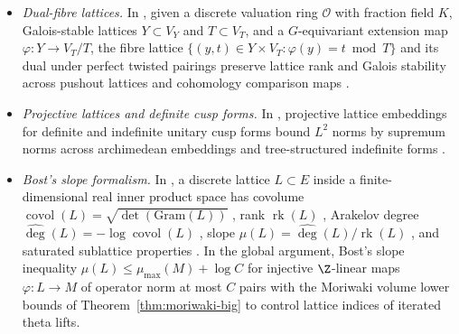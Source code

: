 \begin{itemize}
  \item \emph{Dual-fibre lattices.} In ,
  given a discrete valuation ring $\mathcal{O}$ with fraction field $K$,
  Galois-stable lattices $Y \subset V_Y$ and $T \subset V_T$, and a
  $G$-equivariant extension map $\varphi : Y \to V_T / T$, the fibre lattice
  $\{(y, t) \in Y \times V_T : \varphi(y) = t \bmod T\}$ and its dual under
  perfect twisted pairings
   preserve
  lattice rank and Galois stability across pushout lattices
   and
  cohomology comparison maps
  .
  \item \emph{Projective lattices and definite cusp forms.} In
  , projective lattice embeddings for definite
  and indefinite unitary cusp forms bound $L^2$ norms by supremum norms
   across archimedean embeddings
   and tree-structured indefinite
  forms .
  \item \emph{Bost's slope formalism.} In ,
  a discrete lattice $L \subset E$ inside a finite-dimensional real inner
  product space has covolume $\operatorname{covol}(L) = \sqrt{\det(\mathrm{Gram}(L))}$
  , rank $\operatorname{rk}(L)$
  , Arakelov degree
  $\widehat{\deg}(L) = -\log\operatorname{covol}(L)$ ,
  slope $\mu(L) = \widehat{\deg}(L)/\operatorname{rk}(L)$
  , and saturated sublattice properties
  . In the global argument,
  Bost's slope inequality $\mu(L) \le \mu_{\max}(M) + \log C$ for injective
  $\Z$-linear maps $\varphi : L \to M$ of operator norm at most $C$ pairs with
  the Moriwaki volume lower bounds of Theorem~\ref{thm:moriwaki-big} to
  control lattice indices of iterated theta lifts.
\end{itemize}

